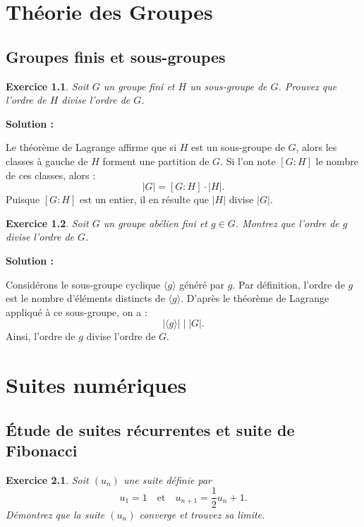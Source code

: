 \documentclass[11pt,twoside,openany]{book}
\newtheorem{exercice}{Exercice}[chapter]%
\newenvironment{solution}{\par\textbf{Solution :}\par\small}{\normalsize\par}
\begin{document}
\chapter{Théorie des Groupes}
\section{Groupes finis et sous-groupes}

\begin{exercice}
Soit $G$ un groupe fini et $H$ un sous-groupe de $G$. Prouvez que l'ordre de $H$ divise l'ordre de $G$.
\end{exercice}

\begin{solution}
Le théorème de Lagrange affirme que si $H$ est un sous-groupe de $G$, alors les classes à gauche de $H$ forment une partition de $G$. Si l'on note $[G : H]$ le nombre de ces classes, alors :
\[
|G| = [G : H] \cdot |H|.
\]
Puisque $[G : H]$ est un entier, il en résulte que $|H|$ divise $|G|$.
\end{solution}

\begin{exercice}
Soit $G$ un groupe abélien fini et $g \in G$. Montrez que l'ordre de $g$ divise l'ordre de $G$.
\end{exercice}

\begin{solution}
Considérons le sous-groupe cyclique $\langle g \rangle$ généré par $g$. Par définition, l'ordre de $g$ est le nombre d'éléments distincts de $\langle g \rangle$. D'après le théorème de Lagrange appliqué à ce sous-groupe, on a :
\[
|\langle g \rangle| \mid |G|.
\]
Ainsi, l'ordre de $g$ divise l'ordre de $G$.
\end{solution}

\chapter{Suites numériques}
\section{Étude de suites récurrentes et suite de Fibonacci}

\begin{exercice}
Soit $(u_n)$ une suite définie par 
\[
u_1=1 \quad \text{et} \quad u_{n+1}=\frac{1}{2}u_n+1.
\]
Démontrez que la suite $(u_n)$ converge et trouvez sa limite.
\end{exercice}
\end{document}
